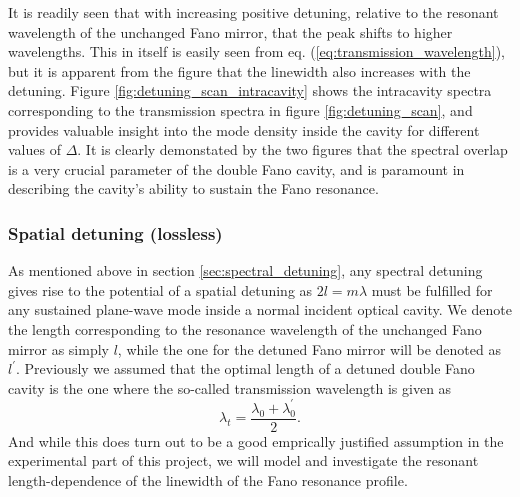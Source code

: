 It is readily seen that with increasing positive detuning, relative to the resonant wavelength of the unchanged Fano mirror, that the peak shifts to higher wavelengths. This in itself is easily seen from eq. (\ref{eq:transmission_wavelength}), but it is apparent from the figure that the linewidth also increases with the detuning. Figure \ref{fig:detuning_scan_intracavity} shows the intracavity spectra corresponding to the transmission spectra in figure \ref{fig:detuning_scan}, and provides valuable insight into the mode density inside the cavity for different values of $\Delta$. It is clearly demonstated by the two figures that the spectral overlap is a very crucial parameter of the double Fano cavity, and is paramount in describing the cavity's ability to sustain the Fano resonance. 

\subsubsection{Spatial detuning (lossless)} \label{sec:spacial_detuning}

As mentioned above in section \ref{sec:spectral_detuning}, any spectral detuning gives rise to the potential of a spatial detuning as $2l = m\lambda$ must be fulfilled for any sustained plane-wave mode inside a normal incident optical cavity. We denote the length corresponding to the resonance wavelength of the unchanged Fano mirror as simply $l$, while the one for the detuned Fano mirror will be denoted as $l^{\prime}$. Previously we assumed that the optimal length of a detuned double Fano cavity is the one where the so-called transmission wavelength is given as 
\begin{equation}
    \lambda_t = \frac{\lambda_{0} + \lambda_{0}^{\prime}}{2}.
\end{equation}
And while this does turn out to be a good emprically justified assumption in the experimental part of this project, we will model and investigate the resonant length-dependence of the linewidth of the Fano resonance profile. 

